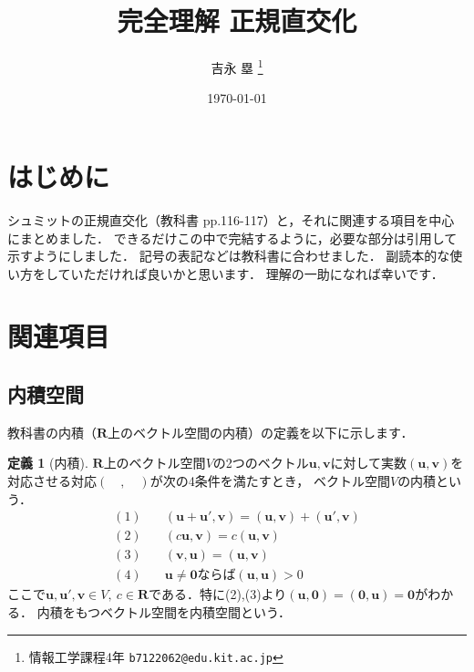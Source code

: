 \documentclass[dvipdfmx]{jsarticle}
\title{完全理解 正規直交化}
\author{吉永 塁 \thanks{情報工学課程4年 \texttt{b7122062@edu.kit.ac.jp}}}
\date{\today}
\theoremstyle{definition}
\newtheorem*{definition*}{定義}
\begin{document}
\maketitle{}

\section{はじめに}
シュミットの正規直交化（教科書\cite{la} pp.116-117）と，それに関連する項目を中心にまとめました．
できるだけこの中で完結するように，必要な部分は引用して示すようにしました．
記号の表記などは教科書に合わせました．
副読本的な使い方をしていただければ良いかと思います．
理解の一助になれば幸いです．



\section{関連項目}

\subsection{内積空間}
教科書の内積（$\bm{R}$上のベクトル空間の内積）の定義を以下に示します．

\begin{leftbar}
    \begin{definition*}[内積]
        $\bm{R}$上のベクトル空間$V$の2つのベクトル$\bm{u}, \bm{v}$に対して実数$(\bm{u}, \bm{v})$を対応させる対応$( \quad , \quad )$が次の4条件を満たすとき，
        ベクトル空間$V$の内積という．
        \begin{align*}
            (1) \quad &(\bm{u} + \bm{u}', \bm{v}) = (\bm{u}, \bm{v}) + (\bm{u}', \bm{v}) \\
            (2) \quad &(c \bm{u}, \bm{v}) = c (\bm{u}, \bm{v}) \\
            (3) \quad &(\bm{v}, \bm{u}) = (\bm{u}, \bm{v}) \\
            (4) \quad &\bm{u} \neq \bm{0} \text{ならば} (\bm{u}, \bm{u}) > 0
        \end{align*}
        ここで$\bm{u}, \bm{u}', \bm{v} \in V, \ c \in \bm{R}$である．特に(2),(3)より$(\bm{u}, \bm{0}) = (\bm{0}, \bm{u}) = \bm{0}$がわかる．
        内積をもつベクトル空間を内積空間という．
    \end{definition*}
\end{leftbar}
\end{document}
